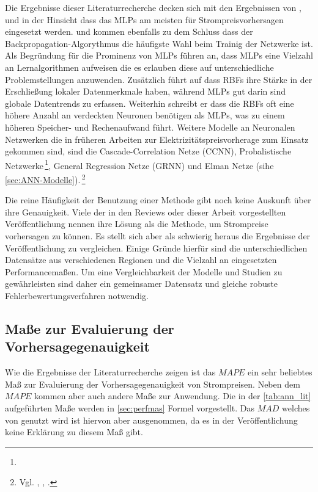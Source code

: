 Die Ergebnisse dieser Literaturrecherche decken sich mit den Ergebnissen von \citet{Aggarwal2009}, \citet{Weron2014} und \citet{Panapakidis2016} in der Hinsicht dass das MLPs am meisten für Strompreisvorhersagen eingesetzt werden. \citet{Aggarwal2009} und \citet{Weron2014} kommen ebenfalls zu dem Schluss dass der Backpropagation-Algorythmus die häufigste Wahl beim Trainig der Netzwerke ist. Als Begründung für die Prominenz von MLPs führen \citet{Panapakidis2016} an, dass MLPs eine Vielzahl an Lernalgorithmen aufweisen die es erlauben diese auf unterschiedliche Problemstellungen anzuwenden. Zusätzlich führt \citet{Weron2014} auf dass RBFs ihre Stärke in der Erschließung lokaler Datenmerkmale haben, während MLPs gut darin sind globale Datentrends zu erfassen. Weiterhin schreibt er dass die RBFs oft eine höhere Anzahl an verdeckten Neuronen benötigen als MLPs, was zu einem höheren Speicher- und Rechenaufwand führt. 
Weitere Modelle an Neuronalen Netzwerken die in früheren Arbeiten zur Elektrizitätspreisvorherage zum Einsatz gekommen sind, sind die Cascade-Correlation Netze (CCNN), Probalistische Netzwerke\,\footnote{}, General Regression Netze (GRNN) und Elman Netze (sihe \autoref{sec:ANN-Modelle}).\,\footnote{Vgl. \citet[757]{Cerjan2013}, \citet[28 ff]{Weron2014}, \citet[134]{Panapakidis2016}.}

Die reine Häufigkeit der Benutzung einer Methode gibt noch keine Auskunft über ihre Genauigkeit. Viele der in den Reviews oder dieser Arbeit vorgestellten Veröffentlichung nennen ihre Lösung als die Methode, um Strompreise vorhersagen zu können. Es stellt sich aber als schwierig heraus die Ergebnisse der Veröffentlichung zu vergleichen. Einige Gründe hierfür sind die unterschiedlichen Datensätze aus verschiedenen Regionen und die Vielzahl an eingesetzten Performancemaßen. Um eine Vergleichbarkeit der Modelle und Studien zu gewährleisten sind daher ein gemeinsamer Datensatz und gleiche robuste Fehlerbewertungsverfahren  notwendig.\, 

\subsection{Maße zur Evaluierung der Vorhersagegenauigkeit}\label{sec:eval_maße}

Wie die Ergebnisse der Literaturrecherche zeigen ist das $MAPE$ ein sehr beliebtes Maß zur Evaluierung der Vorhersagegenauigkeit von Strompreisen. Neben dem $MAPE$ kommen aber auch andere Maße zur Anwendung. Die in der \autoref{tab:ann_lit} aufgeführten Maße werden in \autoref{sec:perfmas} Formel vorgestellt. Das $MAD$ welches von \citet{Keles2016} genutzt wird ist hiervon aber ausgenommen, da es in der Veröffentlichung keine Erklärung zu diesem Maß gibt.

